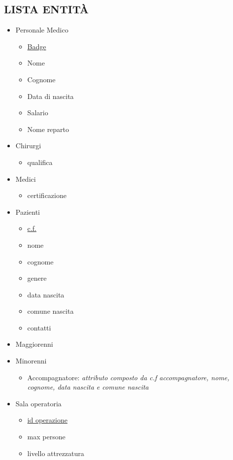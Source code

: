 \documentclass[a4paper, 10pt]{article}
\begin{document}
\subsection{LISTA ENTITÀ}
\begin{spacing}{0.1}
\begin{itemize}
    \item Personale Medico
\begin{itemize}
    \item \underline{Badge}
\end{itemize}
\begin{itemize}
        \item Nome
        \item Cognome
        \item Data di nascita
        \item Salario
        \item Nome reparto
\end{itemize}
\item Chirurgi
\begin{itemize}
    \item qualifica
\end{itemize}
\item Medici 
\begin{itemize}
    \item certificazione
\end{itemize}
\item Pazienti
\begin{itemize}
    \item \underline{c.f.}
    \item nome
    \item cognome
    \item genere
    \item data nascita
    \item comune nascita
    \item contatti
\end{itemize}

\item Maggiorenni

\item Minorenni
\begin{itemize}
    \item Accompagnatore: \textit{attributo composto da c.f accompagnatore, nome, cognome, data nascita e comune nascita}
\end{itemize}
\item Sala operatoria
\begin{itemize}
    \item \underline{id operazione}
    \item max persone
    \item livello attrezzatura
\end{itemize}


\end{itemize}
\end{spacing}
\end{document}
